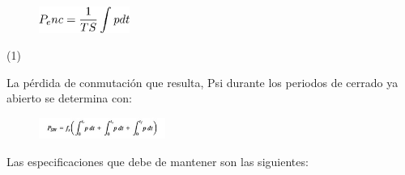 \documentclass[12pt]{article}
\begin{document}

\begin{figure}[H]
	\begin{Center}
		\includegraphics[width=1.17in,height=0.34in]{./media/image5.png}
	\end{Center}
\end{figure}



\setlength{\parskip}{4.32pt}
 \tabto{3.39in}  \tabto{6.69in} (1)\par

\setlength{\parskip}{0.0pt}
La pérdida de conmutación que resulta, Psi durante los periodos de cerrado ya abierto se determina con:\par


\vspace{\baselineskip}
\setlength{\parskip}{29.88pt}



\begin{figure}[H]
	\begin{Center}
		\includegraphics[width=1.62in,height=0.27in]{./media/image6.jpg}
	\end{Center}
\end{figure}



\par


\vspace{\baselineskip}

\vspace{\baselineskip}

\vspace{\baselineskip}
\setlength{\parskip}{12.84pt}
\begin{adjustwidth}{0.25in}{0.0in}
Las especificaciones que debe de mantener son las siguientes:\par

\end{adjustwidth}
\end{document}
